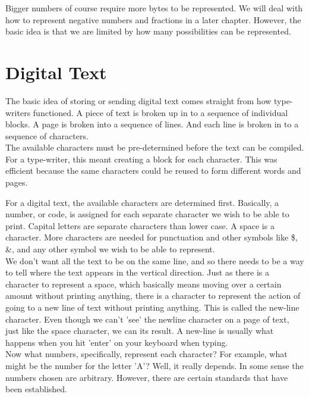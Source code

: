 Bigger numbers of course require more bytes to be represented. We will deal with how to represent negative numbers and fractions in a later chapter. However, the basic idea is that we are limited by how many possibilities can be represented.

\section{Digital Text}

The basic idea of storing or sending digital text comes straight from how type-writers functioned. A piece of text is broken up in to a sequence of individual blocks. A page is broken into a sequence of lines. And each line is broken in to a sequence of characters.\\

The available characters must be pre-determined before the text can be compiled. For a type-writer, this meant creating a block for each character. This was efficient because the same characters could be reused to form different words and pages.\\

\begin{center}\end{center}

For a digital text, the available characters are determined first. Basically, a number, or code, is assigned for each separate character we wish to be able to print. Capital letters are separate characters than lower case. A space is a character. More characters are needed for punctuation and other symbols like \$, \&, and any other symbol we wish to be able to represent.\\

We don't want all the text to be on the same line, and so there needs to be a way to tell where the text appears in the vertical direction. Just as there is a character to represent a space, which basically means moving over a certain amount without printing anything, there is a character to represent the action of going to a new line of text without printing anything. This is called the new-line character. Even though we can't 'see' the newline character on a page of text, just like the space character, we can its result. A new-line is usually what happens when you hit 'enter' on your keyboard when typing.\\

Now what numbers, specifically, represent each character? For example, what might be the number for the letter 'A'? Well, it really depends. In some sense the numbers chosen are arbitrary. However, there are certain standards that have been established.\\

